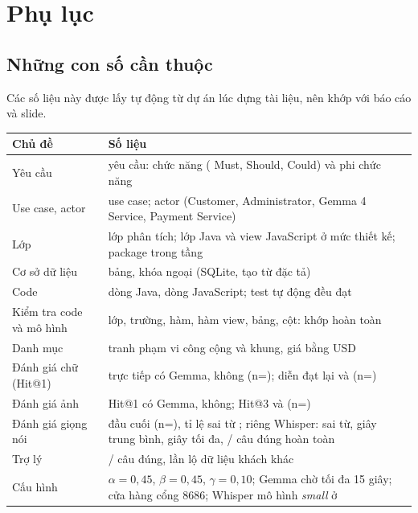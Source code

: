 \section{Phụ lục}\label{sec:phuluc}

\subsection{Những con số cần thuộc}
Các số liệu này được lấy tự động từ dự án lúc dựng tài liệu, nên khớp với báo cáo và slide.
\begin{center}\small
\begin{tabular}{@{}P{4.6cm}P{11.2cm}@{}}
\toprule
\textbf{Chủ đề} & \textbf{Số liệu}\\
\midrule
Yêu cầu & \factReq{} yêu cầu: \factFR{} chức năng (\factMust{} Must, \factShould{} Should, \factCould{} Could) và \factNFR{} phi chức năng\\
Use case, actor & \factUC{} use case; \factActors{} actor (Customer, Administrator, Gemma 4 Service, Payment Service)\\
Lớp & \factAnalysis{} lớp phân tích; \factJavaClasses{} lớp Java và \factJsViews{} view JavaScript ở mức thiết kế; \factPackages{} package trong \factLayers{} tầng\\
Cơ sở dữ liệu & \factTables{} bảng, \factFKs{} khóa ngoại (SQLite, tạo từ đặc tả)\\
Code & \factJavaLines{} dòng Java, \factJsLines{} dòng JavaScript; \factTests{} test tự động đều đạt\\
Kiểm tra code và mô hình & \factCheckClasses{} lớp, \factCheckFields{} trường, \factCheckOps{} hàm, \factCheckViews{} hàm view, \factCheckTables{} bảng, \factCheckColumns{} cột: khớp hoàn toàn\\
Danh mục & \factPaintings{} tranh phạm vi công cộng và \factFrames{} khung, giá bằng USD\\
Đánh giá chữ (Hit@1) & trực tiếp \evTextDirectGemma{} có Gemma, \evTextDirectRules{} không (n=\evTextDirectN{}); diễn đạt lại \evTextParaGemma{} và \evTextParaRules{} (n=\evTextParaN{})\\
Đánh giá ảnh & Hit@1 \evImageGemma{} có Gemma, \evImageLocal{} không; Hit@3 \evImageGemmaThree{} và \evImageLocalThree{} (n=\evImageN{})\\
Đánh giá giọng nói & đầu cuối \evVoiceHit{} (n=\evVoiceN{}), tỉ lệ sai từ \evVoiceWer{}; riêng Whisper: \evSttWer{} sai từ, \evSttMean{} giây trung bình, \evSttMax{} giây tối đa, \evSttExact{}/\evSttN{} câu đúng hoàn toàn\\
Trợ lý & \evAssistantCorrect{}/\evAssistantN{} câu đúng, \evAssistantLeaks{} lần lộ dữ liệu khách khác\\
Cấu hình & $\alpha=0{,}45$, $\beta=0{,}45$, $\gamma=0{,}10$; Gemma chờ tối đa 15 giây; cửa hàng cổng 8686; Whisper mô hình \emph{small} ở \\
\bottomrule
\end{tabular}
\end{center}

